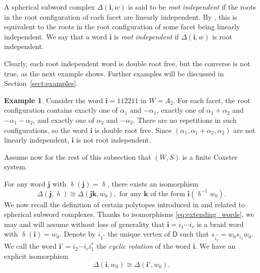 \documentclass[a4paper, 11pt]{amsart}
\newcommand{\word}[1]{\mathbf{#1}}
\DeclareMathOperator{\dem}{\delta}
\newcommand{\dynkin}{\mathsf{D}}
\theoremstyle{definition}
\newtheorem{example}[theorem]{Example}
\begin{document}
A spherical subword complex $\Delta(\word{i},w)$ is said to be \emph{root independent} if the roots in the root configuration of each facet are linearly independent. By \cite[Lemma 3.6]{pilaud_stump_15}, this is equivalent to the roots in the root configuration of some facet being linearly independent. We say that a word $\word{i}$ is \emph{root independent} if $\Delta(\word{i},w)$ is root independent. 

Clearly, each root independent word is double root free, but the converse is not true, as the next example shows. Further examples will be discussed in Section~\ref{sect:examples}. 

\begin{example}
\label{ex:112211}
Consider the word $\word{i} = 112211$ in $W = A_2$. For each facet, the root configuration contains exactly one of $\alpha_1$ and $-\alpha_1$, exactly one of $\alpha_1 + \alpha_2$ and $-\alpha_1 -  \alpha_2$, and exactly one of $\alpha_2$ and $-\alpha_2$. There are no repetitions in such configurations, so the word $\word{i}$ is double root free. Since $(\alpha_1, \alpha_1 + \alpha_2, \alpha_2)$ are not linearly independent, $\word{i}$ is not root independent. 
\end{example}

\bigskip

Assume now for the rest of this subsection that $(W, S)$ is a finite Coxeter system. 

For any word $\word{j}$ with $\dem(\word{j}) = \dem$, there exists an isomorphism \cite[Theorem 3.7]{cls}
\begin{equation}
\label{eq:extending_words}
\Delta(\word{j}, \dem) \cong \Delta(\word{j} \word{k}, w_0), \,\, \mbox{for any} \,\, \word{k} \,\, \mbox{of the form} \,\, \word{i}(\dem^{-1}w_0).
\end{equation}
We now recall the definition of certain polytopes introduced in \cite{pilaud_santos_12, pilaud_stump_15} and related to spherical subword complexes. Thanks to isomorphisms \eqref{eq:extending_words}, we may and will assume without loss of generality that $\word{i} = i_1\cdots i_r$ is a braid word with $\dem(\word{i}) = w_0$. Denote by $i_{1^*}$ the unique vertex of $\dynkin$ such that $s_{i_{1}^*} = w_0 s_{i_1} w_0$.
We call the word $\word{i'} = i_2\cdots i_r i_{1}^*$ the \emph{cyclic rotation} of the word $\word{i}$. We have an explicit isomorphism \cite[Proposition 3.9]{cls}
\[
\Delta(\word{i}, w_0) \cong \Delta(\word{i'}, w_0).
\]
\end{document}
